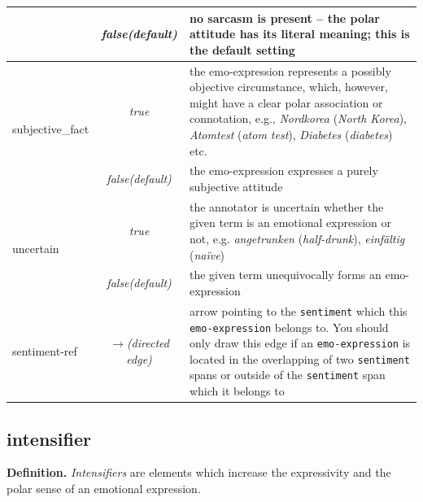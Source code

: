 \begin{center}
\begin{table}[ht]
\begin{tabular}{|l|c|p{0.935\clmnwidth}|}
      & \textit{false\newline(default)} & no sarcasm is present -- the
      polar attitude has its literal meaning; this is the default
      setting\\\hline


      \multirow{2}{*}{subjective\_fact} & \textit{true} & the
      emo-expression represents a possibly objective circumstance,
      which, however, might have a clear polar association or
      connotation, e.g., \emph{Nordkorea} (\emph{North Korea}),
      \emph{Atomtest} (\emph{atom test}), \emph{Diabetes}
      (\emph{diabetes}) etc.\\\cline{2-3}

      & \textit{false\newline(default)} & the emo-expression expresses
      a purely subjective attitude\\\hline


      \multirow{2}{*}{uncertain} & \textit{true} & the annotator is
      uncertain whether the given term is an emotional expression or
      not, e.g. \emph{angetrunken} (\emph{half-drunk}),
      \emph{einf\"altig} (\emph{na\"{i}ve})\\\cline{2-3}

      & \textit{false\newline(default)} & the given term unequivocally
      forms an emo-expression\\\hline


      sentiment-ref & \textit{$\longrightarrow$\newline(directed
        edge)} & arrow pointing to the \texttt{sentiment} which this
      \texttt{emo-expression} belongs to.  You should only draw this
      edge if an \texttt{emo-expression} is located in the overlapping
      of two \texttt{sentiment} spans or outside of the
      \texttt{sentiment} span which it belongs to\\\hline
    \end{tabular}
    \label{tbl:emo-expression}
  \end{table}
\end{center}

\subsection{intensifier}
\noindent\textbf{Definition.} \emph{Intensifiers} are elements which increase
the expressivity and the polar sense of an emotional expression.

